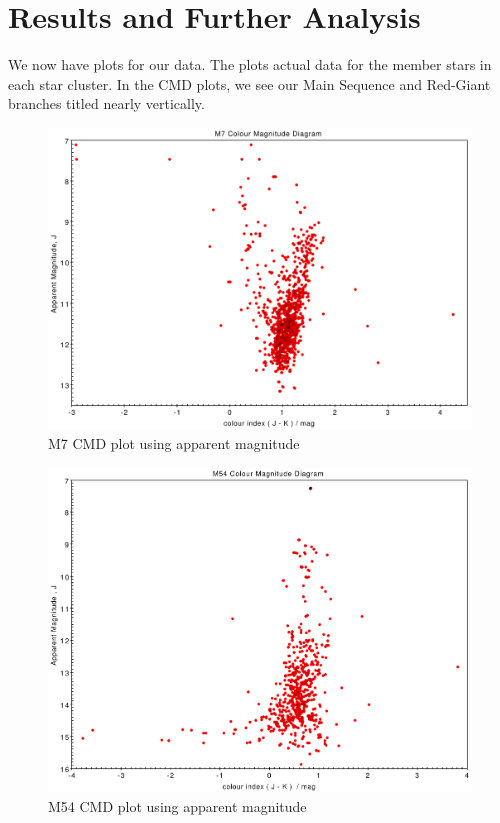 \documentclass[12pt]{article}
\begin{document}
	
	\section{Results and Further Analysis}
	We now have plots for our data. The plots actual data for the member stars in each star cluster. In the CMD plots, we see our Main Sequence and Red-Giant branches titled nearly vertically.
		\begin{figure}[h!]
			\includegraphics[width=\textwidth]{m7_cmd_apparent}
			\caption{M7 CMD plot using apparent magnitude}
			\label{fig: m7_cmd}
		\end{figure}
		\begin{figure}[h!]
			\includegraphics[width=\textwidth]{m54_cmd_apparent}
			\caption{M54 CMD plot using apparent magnitude}
			\label{fig: m54_cmd}
		\end{figure}
\end{document}

